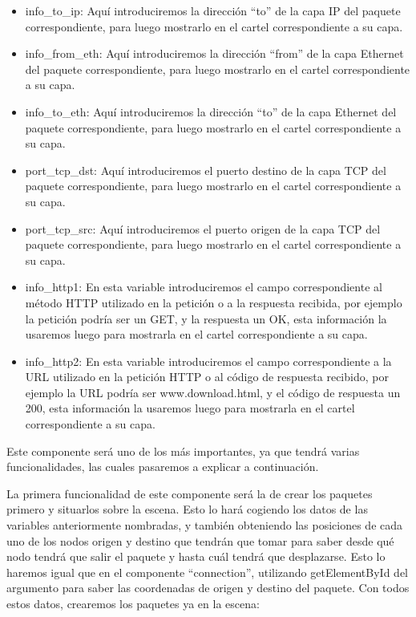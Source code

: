 \documentclass[a4paper, 12pt]{book}
\begin{document}
\begin{itemize}
    \item info\_to\_ip: Aquí introduciremos la dirección “to” de la capa IP del paquete correspondiente, para luego mostrarlo en el cartel correspondiente a su capa.
    
    \item info\_from\_eth: Aquí introduciremos la dirección “from” de la capa Ethernet del paquete correspondiente, para luego mostrarlo en el cartel correspondiente a su capa.
    
    \item info\_to\_eth: Aquí introduciremos la dirección “to” de la capa Ethernet del paquete correspondiente, para luego mostrarlo en el cartel correspondiente a su capa.
    
    \item port\_tcp\_dst: Aquí introduciremos el puerto destino de la capa TCP del paquete correspondiente, para luego mostrarlo en el cartel correspondiente a su capa.
    
    \item port\_tcp\_src: Aquí introduciremos el puerto origen de la capa TCP del paquete correspondiente, para luego mostrarlo en el cartel correspondiente a su capa.

    \item info\_http1: En esta variable introduciremos el campo correspondiente al método HTTP utilizado en la petición o a la respuesta recibida, por ejemplo la petición podría ser un GET, y la respuesta un OK, esta información la usaremos luego para mostrarla en el cartel correspondiente a su capa.
    
    \item info\_http2: En esta variable introduciremos el campo correspondiente a la URL utilizado en la petición HTTP o al código de respuesta recibido, por ejemplo la URL podría ser www.download.html, y el código de respuesta un 200, esta información la usaremos luego para mostrarla en el cartel correspondiente a su capa.

\end{itemize}

Este componente será uno de los más importantes, ya que tendrá varias funcionalidades, las cuales pasaremos a explicar a continuación.

La primera funcionalidad de este componente será la de crear los paquetes primero y situarlos sobre la escena. Esto lo hará cogiendo los datos de las variables anteriormente nombradas, y también obteniendo las posiciones de cada uno de los nodos origen y destino que tendrán que tomar para saber desde qué nodo tendrá que salir el paquete y hasta cuál tendrá que desplazarse. Esto lo haremos igual que en el componente “connection”, utilizando getElementById del argumento para saber las coordenadas de origen y destino del paquete.
Con todos estos datos, crearemos los paquetes ya en la escena:
\end{document}
